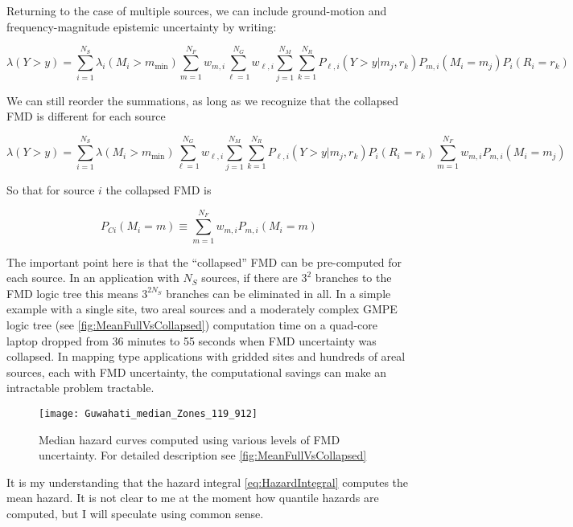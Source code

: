 \documentclass{article}
\begin{document}
Returning to the case of multiple sources, we can include ground-motion and frequency-magnitude epistemic uncertainty by writing:

$$ \lambda(Y > y) = 
\sum_{i=1}^{N_S} 
\lambda_i(M_i > m_\text{min}) 
\sum_{m=1}^{N_F} w_{m,i} 
\sum_{\ell=1}^{N_G} w_{\ell,i}
\sum_{j=1}^{N_M} 
\sum_{k=1}^{N_R} 
P_{\ell,i}(Y > y|m_j,r_k) 
P_{m,i}(M_i=m_j) 
P_i(R_i=r_k) $$

We can still reorder the summations, as long as we recognize that the collapsed FMD is different for each source

$$
\lambda(Y > y) = 
\sum_{i=1}^{N_S} 
\lambda(M_i > m_\text{min}) 
\sum_{\ell=1}^{N_G} w_{\ell,i}
\sum_{j=1}^{N_M} 
\sum_{k=1}^{N_R} 
P_{\ell,i}(Y > y|m_j,r_k) 
P_i(R_i=r_k) 
\sum_{m=1}^{N_F} w_{m,i} 
P_{m,i}(M_i=m_j) 
$$

So that for source $i$ the collapsed FMD is

\begin{equation} \label{eq:CollapsedFmd} 
P_{Ci}(M_i = m) \equiv
\sum_{m=1}^{N_F} w_{m,i} 
P_{m,i}(M_i=m) 
\end{equation}

The important point here is that the ``collapsed'' FMD can be pre-computed for each source. In an application with $N_S$ sources, if there are $3^2$ branches to the FMD logic tree this means $3^{2 N_S}$ branches can be eliminated in all. In a simple example with a single site, two areal sources and a moderately complex GMPE logic tree (see \autoref{fig:MeanFullVsCollapsed}) computation time on a quad-core laptop dropped from 36 minutes to 55 seconds when FMD uncertainty was collapsed. In mapping type applications with gridded sites and hundreds of areal sources, each with FMD uncertainty, the computational savings can make an intractable problem tractable. 

\begin{figure}[!htb]
\begin{adjustbox}{center}
\texttt{[image: Guwahati\_median\_Zones\_119\_912]}
\end{adjustbox}
\caption[Median hazard curves computed using various levels of FMD uncertainty]{Median hazard curves computed using various levels of FMD uncertainty. For detailed description see \autoref{fig:MeanFullVsCollapsed}} 
\label{fig:MedianFullVsCollapsed}
\end{figure}

It is my understanding that the hazard integral \eqref{eq:HazardIntegral} computes the mean hazard. It is not clear to me at the moment how quantile hazards are computed, but I will speculate using common sense. 
\end{document}
